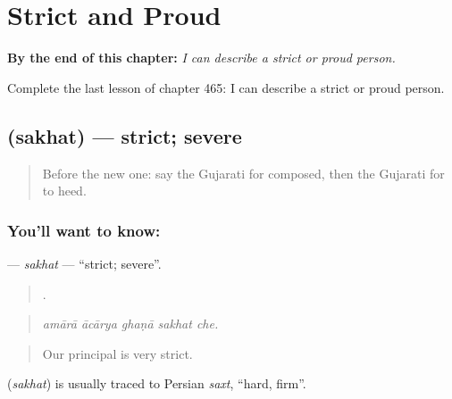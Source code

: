 
\chapter{Strict and Proud}
\label{ch:gu-strict-and-proud}

\begin{chapteropening}
\textbf{By the end of this chapter:} \emph{I can describe a strict or proud person.}

Complete the last lesson of chapter 465: I can describe a strict or proud person.
\end{chapteropening}

\section[\texorpdfstring{\gu{સખત} (sakhat)}{સખત (sakhat)}]{ (sakhat) — strict; severe}

\label{lesson:GU-C465-sakhat}



\begin{quote}
Before the new one: say the Gujarati for composed, then the Gujarati for to heed.
\end{quote}

\subsection*{You'll want to know: }
\textbf{} — \emph{sakhat} — \textquotedblleft{}strict; severe\textquotedblright{}.

\begin{quote}
    .
\end{quote}

\begin{quote}
\emph{amārā ācārya ghaṇā sakhat che.}
\end{quote}

\begin{quote}
Our principal is very strict.
\end{quote}

\begin{cousinweb}
\textbf{} (\emph{sakhat}) is usually traced to Persian \emph{saxt}, \textquotedblleft{}hard, firm\textquotedblright{}.
\end{cousinweb}

